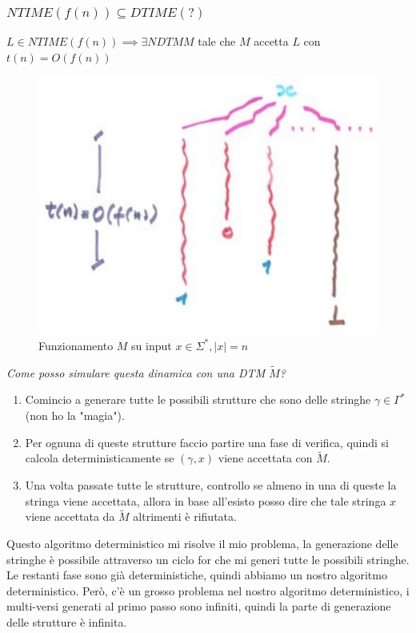 \documentclass{article}
\begin{document}
\subsubsection{$NTIME(f(n))\subseteq DTIME(?)$}
$L\in NTIME(f(n))\implies\exists NDTM M$ tale che $M$ accetta $L$ con $t(n)=O(f(n))$
\begin{figure}[H]
    \centering
    \includegraphics[scale=0.6]{images/ndtmfunct.png}
    \caption{Funzionamento $M$ su input $x\in\Sigma^*,|x|=n$}
\end{figure}
\textit{Come posso simulare questa dinamica con una DTM $\tilde{M}$?}
\begin{enumerate}
    \item Comincio a generare tutte le possibili strutture che sono delle stringhe $\gamma\in\Gamma^*$ (non ho
          la "magia").

    \item Per ognuna di queste strutture faccio partire una fase di verifica, quindi si
          calcola deterministicamente se $(\gamma,x)$ viene accettata con $\tilde{M}$.

    \item Una volta passate tutte le strutture, controllo se almeno in una di queste
          la stringa viene accettata, allora in base all'esisto posso dire che tale stringa $x$ viene accettata
          da $\tilde{M}$ altrimenti è rifiutata.

\end{enumerate}
Questo algoritmo deterministico mi risolve il mio problema, la generazione delle stringhe
è possibile attraverso un ciclo for che mi generi tutte le possibili stringhe. Le restanti
fase sono già deterministiche, quindi abbiamo un nostro algoritmo deterministico.
Però, c'è un grosso problema nel nostro algoritmo deterministico, i multi-versi generati
al primo passo sono infiniti, quindi la parte di generazione delle strutture è infinita.
\end{document}
